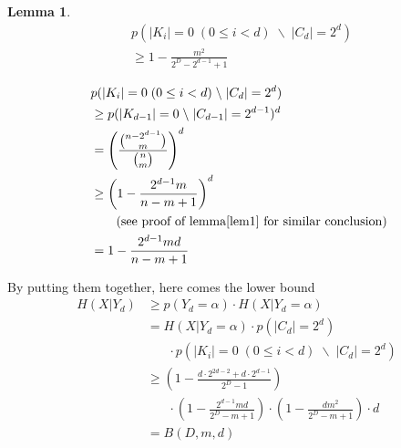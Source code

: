 \documentclass[10pt, conference, compsocconf]{IEEEtran}
\newtheorem{mylemma}{Lemma}
\begin{document}
        \begin{mylemma}
            \begin{align*}
            &p(|K_i| = 0    \; (0 \leq i < d) \; \backslash \; |C_d| = 2^d) \\
                &\geq 1-\frac{m^2}{2^D-2^{d-1}+1}
            \end{align*}
        \end{mylemma}

        \begin{IEEEproof}
            \begin{align*}
                &p(|K_i| = 0    \; (0 \leq i < d) \; \backslash \; |C_d| = 2^d) \\\
                    &\geq p(|K_{d-1}| = 0 \; \backslash \; |C_{d-1}| = 2^{d-1})^d\\
                    &= \left(\frac{\binom{n-2^{d-1}}{m}}{\binom{n}{m}} \right)^d\\
                    &\geq \left(1-\frac{2^{d-1}m}{n-m+1}\right)^d   \; \\
                    & \;\;\;\;\;\; \text{ (see proof of lemma\ref{lem1} for similar conclusion})\\
                    &= 1-\frac{2^{d-1}m d}{n-m+1}
            \end{align*}
        \end{IEEEproof}

        By putting them together, here comes the lower bound
        \begin{align*}
            H(X | Y_d) &\geq p(Y_d = \alpha) \cdot H(X | Y_d = \alpha)\\
                &= H(X | Y_d = \alpha) \cdot p(|C_d| = 2^d) \\
                    &\;\;\;\;\;\; \cdot p(|K_i| = 0 \; (0 \leq i < d) \; \backslash \; |C_d| = 2^d) \\
                &\geq (1-\frac{d \cdot 2^{2d-2}+d \cdot 2^{d-1}}{2^D-1})\\
                    &\;\;\;\;\;\; \cdot (1-\frac{2^{d-1}m d}{2^D-m+1})
                    \cdot (1-\frac{dm^2}{2^D-m+1}) \cdot d \\
                &= B(D, m, d)
        \end{align*}
\end{document}
